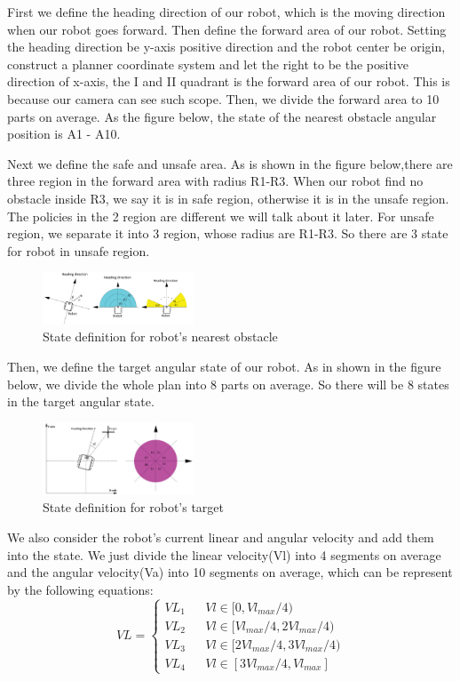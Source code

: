 \documentclass{acmtog} %
\begin{document}
First we define the heading direction of our robot, which is the moving direction when our robot goes forward. Then define the forward area of our robot. Setting the heading direction be y-axis positive direction and the robot center be origin, construct a planner coordinate system and let the right to be the positive direction of x-axis, the I and II quadrant is the forward area of our robot. This is because our camera can see such scope. Then, we divide the forward area to 10 parts on average. As the figure below, the state of the nearest obstacle angular position is A1 - A10.

Next we define the safe and unsafe area. As is shown in the figure below,there are three region in the forward area with radius R1-R3. When our robot find no obstacle inside R3, we say it is in safe region, otherwise it is in the unsafe region. The policies in the 2 region are different we will talk about it later. For unsafe region, we separate it into 3 region, whose radius are R1-R3. So there are 3 state for robot in unsafe region.
\begin{figure}[H]
	\centering
	\includegraphics[width=0.4\textwidth]{ra.PNG}
	\caption{State definition for robot's nearest obstacle}
\end{figure}
Then, we define the target angular state of our robot. As in shown in the figure below, we divide the whole plan into 8 parts on average. So there will be 8 states in the target angular state.
\begin{figure}[H]
	\centering
	\includegraphics[width=0.4\textwidth]{re.PNG}
	\caption{State definition for robot's target}
\end{figure}
	We also consider the robot's current linear and angular velocity and add them into the state. We just divide the linear velocity(Vl) into 4 segments on average and the angular velocity(Va) into 10 segments on average, which can be represent by the following equations:
	\begin{equation}
	VL=\left\{
	\begin{array}{rcl}
	VL_1 & & {Vl \in [0,Vl_{max} / 4)}\\
	VL_2 & & {Vl \in [Vl_{max} / 4,2Vl_{max} / 4)}\\
	VL_3 & & {Vl \in [2Vl_{max} / 4,3Vl_{max} / 4)}\\
	VL_4 & & {Vl \in [3Vl_{max} / 4,Vl_{max}]}
	\end{array} \right.
	\end{equation}
\end{document}
